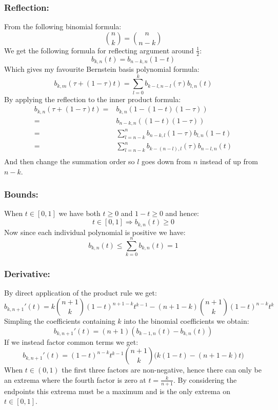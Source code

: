 \subsubsection{Reflection:}
From the following binomial formula:
\[\binom{n}{k}=\binom{n}{n-k}\]
We get the following formula for reflecting argument around $\frac{1}{2}$:
\[b_{k,n}(t) = b_{n-k,n}(1-t)\]
Which gives my favourite Bernstein basis polynomial formula: 
\[ b_{k,m}(\tau+(1-\tau)t) = \sum_{l=0}^kb_{k-l,n-l}(\tau)b_{l,n}(t) \]
By applying the reflection to the inner product formula:
\[\begin{aligned}
	b_{k,n}(\tau+(1-\tau)t) =& b_{k,n}(1-(1-t)(1-\tau))\\
	=& b_{n-k,n}((1-t)(1-\tau))\\
	=&\sum_{l=n-k}^nb_{n-k,l}(1-\tau)b_{l,n}(1-t)\\
	=&\sum_{l=n-k}^nb_{k-(n-l),l}(\tau)b_{n-l,n}(t)\\
\end{aligned}\]
And then change the summation order so $l$ goes down from $n$ instead of up from $n-k$.

\subsubsection{Bounds:}
When $t\in[0,1]$ we have both $t\geq0$ and $1-t\geq0$ and hence:
\[t\in [0,1] \Rightarrow b_{k,n}(t)\geq0 \]
Now since each individual polynomial is positive we have:
\[b_{k,n}(t) \leq \sum_{k=0}^nb_{k,n}(t) = 1\]

\subsubsection{Derivative:}
By direct application of the product rule we get:
\[b_{k,n+1}'(t) = k\binom{n+1}{k}(1-t)^{n+1-k}t^{k-1}-(n+1-k)\binom{n+1}{k}(1-t)^{n-k}t^k\]
Simpling the coefficients containing $k$ into the binomial coefficients we obtain:
\[b_{k,n+1}'(t) = (n+1)(b_{k-1,n}(t)-b_{k,n}(t))\]
If we instead factor common terms we get:
\[b_{k,n+1}'(t) = (1-t)^{n-k}t^{k-1}\binom{n+1}{k}\bigg(k(1-t)-(n+1-k)t\bigg)\]
When $t\in(0,1)$ the first three factors are non-negative,
hence there can only be an extrema where the fourth factor is zero at $t=\frac{k}{n+1}$.
By considering the endpoints this extrema must be a maximum and is the only extrema on $t\in[0,1]$.

